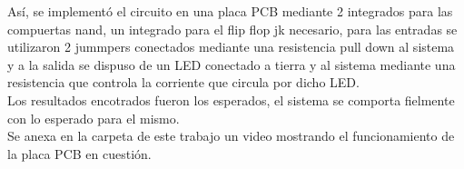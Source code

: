 %
\noindent
Así, se implementó el circuito en una placa PCB mediante 2 integrados para las compuertas nand, un integrado para el flip flop jk necesario, para las entradas se utilizaron 2 jummpers conectados mediante una resistencia pull down al sistema y a la salida se dispuso de un LED conectado a tierra y al sistema mediante una resistencia que controla la corriente que circula por dicho LED.\\
Los resultados encotrados fueron los esperados, el sistema se comporta fielmente con lo esperado para el mismo.\\
Se anexa en la carpeta de este trabajo un video mostrando el funcionamiento de la placa PCB en cuestión.